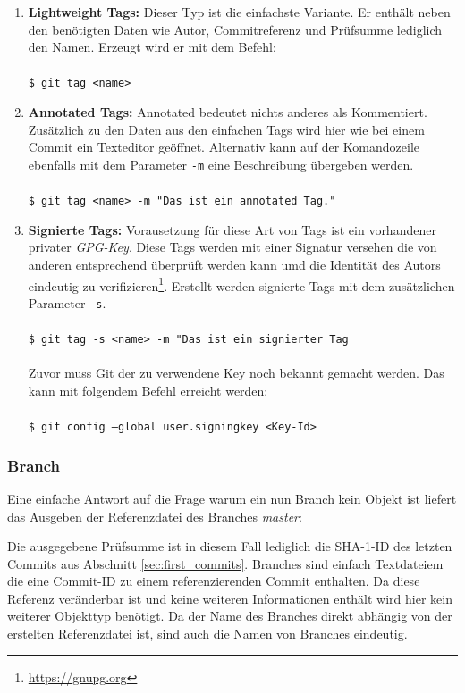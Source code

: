 \begin{enumerate}
\item \textbf{Lightweight Tags:} Dieser Typ ist die einfachste Variante. Er
enthält neben den benötigten Daten wie Autor, Commitreferenz und Prüfsumme
lediglich den Namen. Erzeugt wird er mit dem Befehl: \\\\\texttt{\$ git tag
<name>}\\
\item \textbf{Annotated Tags:} Annotated bedeutet nichts anderes als
Kommentiert. Zusätzlich zu den Daten aus den einfachen Tags wird hier wie bei
einem Commit ein Texteditor geöffnet. Alternativ kann auf der Komandozeile
ebenfalls mit dem Parameter \texttt{-m} eine Beschreibung übergeben
werden.\\\\\texttt{\$ git tag <name> -m "Das ist ein annotated Tag."}\\ 
\item \textbf{Signierte Tags:} Vorausetzung für diese Art von Tags ist ein
vorhandener privater \textit{GPG-Key}. Diese Tags werden mit einer Signatur
versehen die von anderen entsprechend überprüft werden kann umd  die Identität
des Autors eindeutig zu verifizieren\footnote{\url{https://gnupg.org}}.
Erstellt werden signierte Tags mit dem zusätzlichen Parameter
\texttt{-s}.\\\\\texttt{\$ git tag -s  <name> -m "Das ist ein signierter
Tag}\\\\ Zuvor muss Git der zu verwendene Key noch bekannt gemacht werden. Das
kann mit folgendem Befehl erreicht werden:\\\\\texttt{\$ git config --global
user.signingkey <Key-Id>}\\
\end{enumerate}

\subsubsection{Branch}\label{sec:branchobject}
Eine einfache Antwort auf die Frage warum ein nun Branch kein Objekt ist liefert
das Ausgeben der Referenzdatei des Branches \textit{master}:



Die ausgegebene Prüfsumme ist in diesem Fall lediglich die \gls{SHA-1}-ID des
letzten Commits aus Abschnitt \ref{sec:first_commits}. Branches sind einfach
Textdateiem die eine Commit-ID zu einem referenzierenden Commit enthalten. Da
diese Referenz veränderbar ist und keine weiteren Informationen enthält wird
hier kein weiterer Objekttyp benötigt. Da der Name des Branches direkt abhängig
von der erstelten Referenzdatei ist, sind auch die Namen von Branches
eindeutig.

